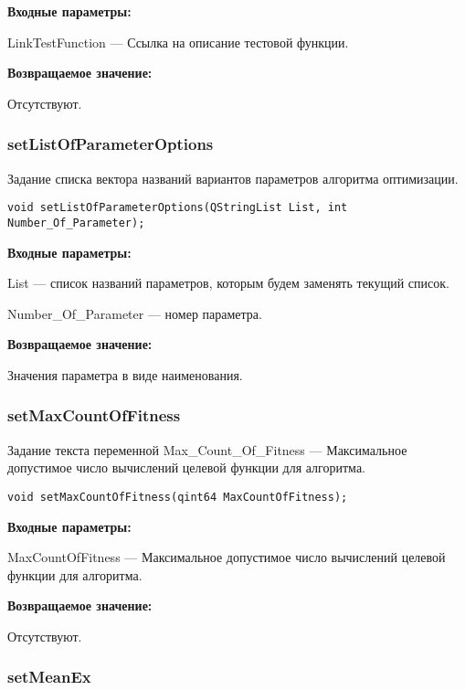 \documentclass[a4paper,12pt]{article}
\begin{document}
\textbf{Входные параметры:}

LinkTestFunction --- Ссылка на описание тестовой функции.

\textbf{Возвращаемое значение:}

Отсутствуют.


\subsubsection{setListOfParameterOptions}\label{setListOfParameterOptions}

Задание списка вектора названий вариантов параметров алгоритма оптимизации.


\begin{lstlisting}[label=code_syntax_setListOfParameterOptions,caption=Синтаксис]
void setListOfParameterOptions(QStringList List, int Number_Of_Parameter);
\end{lstlisting}

\textbf{Входные параметры:}

List --- список названий параметров, которым будем заменять текущий список.
 
    Number\_Of\_Parameter --- номер параметра.

\textbf{Возвращаемое значение:}

Значения параметра в виде наименования.


\subsubsection{setMaxCountOfFitness}\label{setMaxCountOfFitness}

Задание текста переменной  Max\_Count\_Of\_Fitness --- Максимальное допустимое число вычислений целевой функции для алгоритма.


\begin{lstlisting}[label=code_syntax_setMaxCountOfFitness,caption=Синтаксис]
void setMaxCountOfFitness(qint64 MaxCountOfFitness);
\end{lstlisting}

\textbf{Входные параметры:}

MaxCountOfFitness --- Максимальное допустимое число вычислений целевой функции для алгоритма.

\textbf{Возвращаемое значение:}

Отсутствуют.


\subsubsection{setMeanEx}\label{setMeanEx}
\end{document}
